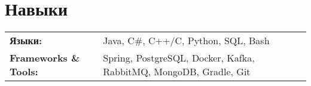 \documentclass[letterpaper,10pt]{article}
\makeatletter
\newcommand{\tframed}[2][]{\tikz[baseline=(h.base)]\node[rndblock,#1] (h) {\color{black}{#2}};}
\newcommand*{\mystrut}{\rule[-0.2\baselineskip]{0pt}{0.8\baselineskip}}
\newcommand{\skill}[1]{\tframed[lightgray]{\mystrut#1}}
\newcommand{\resumeExpSubheading}[5]{
  \vspace{3pt}
  \item
    \begin{tabular*}{0.97\textwidth}{l@{\extracolsep{\fill}}r}
      \vspace{2pt} \textbf{#1}  & \textcolor{mygray}{\small #2} \\
      \textit{#3} & \textcolor{mygray}{\textit{\small #4}} \\
      {\scriptsize#5}
    \end{tabular*}\vspace{3pt}
}
\newcommand{\resumeExpJointSubheading}[5]{
  \vspace{-14pt}
  \item
    \begin{tabular*}{0.97\textwidth}{l@{\extracolsep{\fill}}r}
      \vspace{2pt} \textbf{#1}  & \textcolor{mygray}{\small #2} \\
      \textit{#3} & \textcolor{mygray}{\textit{\small #4}} \\
      {\scriptsize#5}
    \end{tabular*}\vspace{3pt}
}
\newcommand{\resumeSubHeadingListStart}{\begin{itemize}[leftmargin=*]}
\newcommand{\resumeSubHeadingListEnd}{\end{itemize}}
\newcommand{\resumeDesc}[1]{\begin{adjustwidth}{5pt}{0pt}\vspace{-2pt}{#1}\end{adjustwidth}}
\newcommand{\ExternalLink}{
    \tikz[x=1.2ex, y=1.2ex, baseline=-0.05ex]{
        \begin{scope}[x=1ex, y=1ex]
            \clip (-0.1,-0.1) 
                --++ (-0, 1.2) 
                --++ (0.6, 0) 
                --++ (0, -0.6) 
                --++ (0.6, 0) 
                --++ (0, -1);
            \path[draw, 
                line width = 0.5, 
                rounded corners=0.5] 
                (0,0) rectangle (1,1);
        \end{scope}
        \path[draw, line width = 0.5] (0.5, 0.5) 
            -- (1, 1);
        \path[draw, line width = 0.5] (0.6, 1) 
            -- (1, 1) -- (1, 0.6);
        }
    }
\makeatother
\begin{document}
    

\section{Навыки}
 \resumeSubHeadingListStart
 \begin{tabular}{ll}
\textbf{Языки:} & \quad Java, C\#, C++/C, Python, SQL, Bash \\
\textbf{Frameworks \& Tools:} & \quad Spring, PostgreSQL, Docker, Kafka, RabbitMQ, MongoDB, Gradle, Git \\
\end{tabular}
\resumeSubHeadingListEnd
\end{document}

